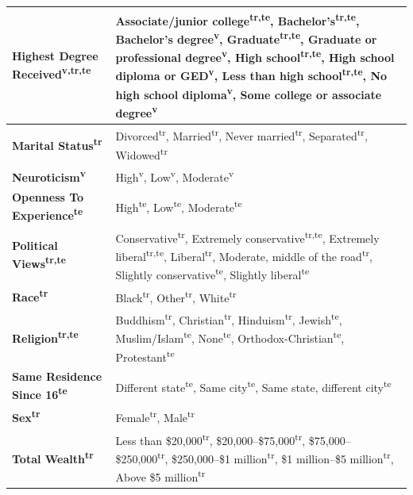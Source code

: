 \begin{table}[htbp]
{\begin{tabular}{lp{8.5cm}}
      \midrule
      \textbf{Highest Degree Received\textsuperscript{v,tr,te}} & Associate/junior college\textsuperscript{tr,te}, Bachelor's\textsuperscript{tr,te}, Bachelor's degree\textsuperscript{v}, Graduate\textsuperscript{tr,te}, Graduate or professional degree\textsuperscript{v}, High school\textsuperscript{tr,te}, High school diploma or GED\textsuperscript{v}, Less than high school\textsuperscript{tr,te}, No high school diploma\textsuperscript{v}, Some college or associate degree\textsuperscript{v} \\
      \midrule
      \textbf{Marital Status\textsuperscript{tr}} & Divorced\textsuperscript{tr}, Married\textsuperscript{tr}, Never married\textsuperscript{tr}, Separated\textsuperscript{tr}, Widowed\textsuperscript{tr} \\
      \midrule
      \textbf{Neuroticism\textsuperscript{v}} & High\textsuperscript{v}, Low\textsuperscript{v}, Moderate\textsuperscript{v} \\
      \midrule
      \textbf{Openness To Experience\textsuperscript{te}} & High\textsuperscript{te}, Low\textsuperscript{te}, Moderate\textsuperscript{te} \\
      \midrule
      \textbf{Political Views\textsuperscript{tr,te}} & Conservative\textsuperscript{tr}, Extremely conservative\textsuperscript{tr,te}, Extremely liberal\textsuperscript{tr,te}, Liberal\textsuperscript{tr}, Moderate, middle of the road\textsuperscript{tr}, Slightly conservative\textsuperscript{te}, Slightly liberal\textsuperscript{te} \\
      \midrule
      \textbf{Race\textsuperscript{tr}} & Black\textsuperscript{tr}, Other\textsuperscript{tr}, White\textsuperscript{tr} \\
      \midrule
      \textbf{Religion\textsuperscript{tr,te}} & Buddhism\textsuperscript{tr}, Christian\textsuperscript{tr}, Hinduism\textsuperscript{tr}, Jewish\textsuperscript{te}, Muslim/Islam\textsuperscript{te}, None\textsuperscript{te}, Orthodox-Christian\textsuperscript{te}, Protestant\textsuperscript{te} \\
      \midrule
      \textbf{Same Residence Since 16\textsuperscript{te}} & Different state\textsuperscript{te}, Same city\textsuperscript{te}, Same state, different city\textsuperscript{te} \\
      \midrule
      \textbf{Sex\textsuperscript{tr}} & Female\textsuperscript{tr}, Male\textsuperscript{tr} \\
      \midrule
      \textbf{Total Wealth\textsuperscript{tr}} & Less than \$20,000\textsuperscript{tr}, \$20,000--\$75,000\textsuperscript{tr}, \$75,000--\$250,000\textsuperscript{tr}, \$250,000--\$1 million\textsuperscript{tr}, \$1 million--\$5 million\textsuperscript{tr}, Above \$5 million\textsuperscript{tr} \\

\end{tabular}}
\end{table}
